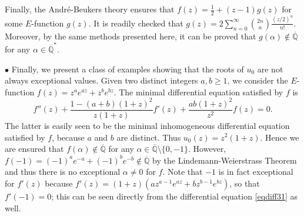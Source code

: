 \documentclass[reqno,english,12pt,a4paper]{smfart}
\numberwithin{equation}{section}
\def\Qbar{\overline{\mathbb Q}}
\begin{document}
Finally, the Andr\'e-Beukers theory ensures that 
$f(z)=\frac{1}{2}+(z-1)g(z)$ for some $E$-function $g(z)$. It is readily checked that 
$g(z)=2\sum_{n=0}^\infty \binom{2n}{n}\frac{(z/2)^n}{n!}$. Moreover, by the same methods presented here, 
it can be proved that $g(\alpha)\notin \Qbar$ for any $\alpha \in \Qbar^*$.

\medskip

$\bullet$ Finally,  we present a class of examples showing that the roots of $u_0$ are not always exceptional values. Given two distinct integers $a,b\ge 1$, we consider the $E$-function $f(z)=z^a e^{az}+z^b e^{bz}$. The minimal differential equation satisfied by $f$ is 
\begin{equation}\label{eqdiff31}
f''(z)+\frac{1-(a+b)(1+z)^2}{z(1+z)}f'(z)+\frac{ab(1+z)^2}{z^2}f(z)=0.
\end{equation}
The latter is  easily seen to be the minimal inhomogeneous differential equation satisfied by $f$, because $a$ and $b$ are distinct. Thus $u_0(z)=z^2(1+z)$. Hence we are ensured that  $f(\alpha)\notin \Qbar$ for any $\alpha \in \Qbar \setminus \{0,-1\}$.
 However, $f(-1)=(-1)^ae^{-a}+(-1)^be^{-b}\notin \Qbar$ by the Lindemann-Weierstrass Theorem and thus there is no exceptional $\alpha\neq 0$ for $f$. Note that $-1$ is in fact exceptional for $f'(z)$ because $f'(z)=(1+z)(az^{a-1}e^{az} + bz^{b-1}e^{bz})$, so that $f'(-1)=0$; this  can be seen directly from the differential equation \eqref{eqdiff31} as well. 
\end{document}
